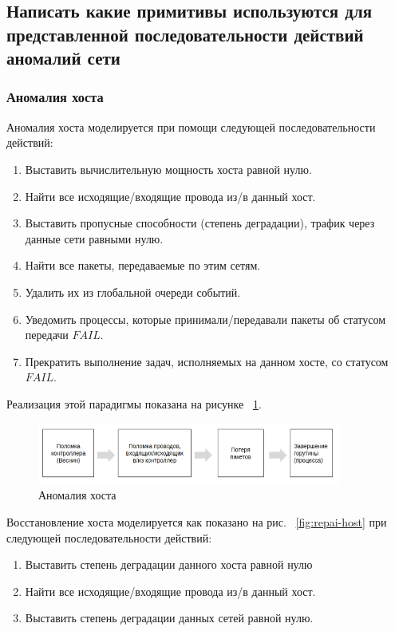 \subsection{Написать какие примитивы используются для представленной последовательности действий аномалий сети}

\subsubsection{Аномалия хоста}

Аномалия хоста моделируется при помощи следующей последовательности действий:

\begin{enumerate}
\item Выставить вычислительную мощность хоста равной нулю.
\item Найти все исходящие/входящие провода из/в данный хост.
\item Выставить пропусные способности (степень деградации), трафик через данные сети равными нулю.
\item Найти все пакеты, передаваемые по этим сетям. 
\item Удалить их из глобальной очереди событий. 
\item Уведомить процессы, которые принимали/передавали пакеты об статусом передачи $FAIL$.
\item Прекратить выполнение задач, исполняемых на данном хосте, со статусом $FAIL$.

\end{enumerate}

Реализация этой парадигмы показана на рисунке ~\ref{fig:anom-host}.

\begin{figure}[!ht]
\centering
\includegraphics[width=10cm]{Kenenbek/images/anom-scheme-host.png}
\caption{Аномалия хоста}
\label{fig:anom-host}
\end{figure}

Восстановление хоста моделируется как показано на рис. ~\ref{fig:repai-host} при следующей последовательности действий:

\begin{enumerate}
\item Выставить степень деградации данного хоста равной нулю
\item Найти все исходящие/входящие провода из/в данный хост.
\item Выставить степень деградации данных сетей равной нулю.
\end{enumerate}

